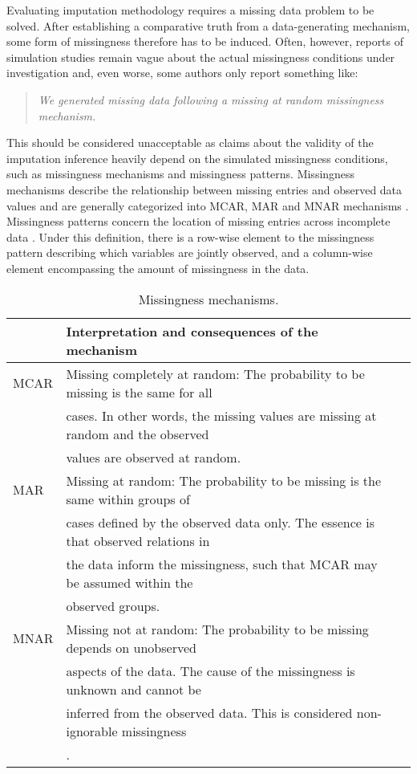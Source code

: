 \documentclass[bimj,fleqn]{w-art}
\begin{document}
Evaluating imputation methodology requires a missing data problem to be solved. After establishing a comparative truth from a data-generating mechanism, some form of missingness therefore has to be induced. Often, however, reports of simulation studies remain vague about the actual missingness conditions under investigation and, even worse, some authors only report something like:
\begin{quote}
\textit{We generated missing data following a missing at random missingness mechanism.}
\end{quote}
This should be considered unacceptable as claims about the validity of the imputation inference heavily depend on the simulated missingness conditions, such as missingness mechanisms and missingness patterns. Missingness mechanisms describe the relationship between missing entries and observed data values and are generally categorized into MCAR, MAR and MNAR mechanisms \citep[][see Table \ref{table:mech}]{rubi76}. Missingness patterns concern the location of missing entries across incomplete data \citep[][p. 8]{litt20}. Under this definition, there is a row-wise element to the missingness pattern describing which variables are jointly observed, and a column-wise element encompassing the amount of missingness in the data. 

\begin{table}[tb]
\begin{center}
\caption{Missingness mechanisms.}
\label{table:mech}
\begin{tabular}{lll}
\hline
      & Interpretation and consequences of the mechanism \\
\hline  
MCAR  & Missing completely at random: The probability to be missing is the same for all \\
      & cases. In other words, the missing values are missing at random and the observed \\
      & values are observed at random. \\ \noalign{\smallskip}
MAR   & Missing at random: The probability to be missing is the same within groups of \\
      & cases defined by the observed data only. The essence is that observed relations in \\
      & the data inform the missingness, such that MCAR may be assumed within the \\ 
      & observed groups. \\ \noalign{\smallskip}
MNAR  & Missing not at random: The probability to be missing depends on unobserved \\
      & aspects of the data. The cause of the missingness is unknown and cannot be \\ 
      & inferred from the observed data. This is considered non-ignorable missingness \\
      & \citep[see e.g.][]{rubi76}. \\
\hline
\end{tabular}
\end{center}
\end{table}
\end{document}

